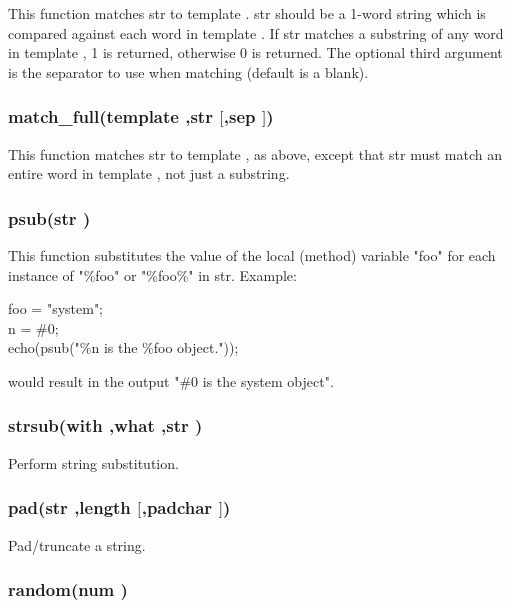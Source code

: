 This function matches {\funcarg str } to {\funcarg template }.  {\funcarg str } should
be a 1-word string which is compared against each word in {\funcarg template }. 
If {\funcarg str } matches a substring of any word in {\funcarg template }, 1 is
returned, otherwise 0 is returned.  The optional third argument is the
separator to use when matching (default is a blank).

\subsubsection{\func match\_full({\funcarg template },{\funcarg str } $[$,{\funcarg sep } $]$)}

This function matches {\funcarg str } to {\funcarg template }, as above, except that
{\funcarg str } must match an entire word in {\funcarg template }, not just a substring.

\subsubsection{\func psub({\funcarg str })}

This function substitutes the value of the local (method) variable
"foo" for each instance of "\%foo" or "\%foo\%" in {\funcarg str}.  Example:

\begin{code}
foo = "system"; \\
n = \#0; \\
echo(psub("\%n is the \%foo object."));
\end{code}
would result in the output "\#0 is the system object".

\subsubsection{\func strsub({\funcarg with },{\funcarg what },{\funcarg str })}

Perform string substitution.

\subsubsection{\func pad({\funcarg str },{\funcarg length $[$},{\funcarg padchar }$]$)}

Pad/truncate a string.

\subsubsection{\func random({\funcarg num })}

